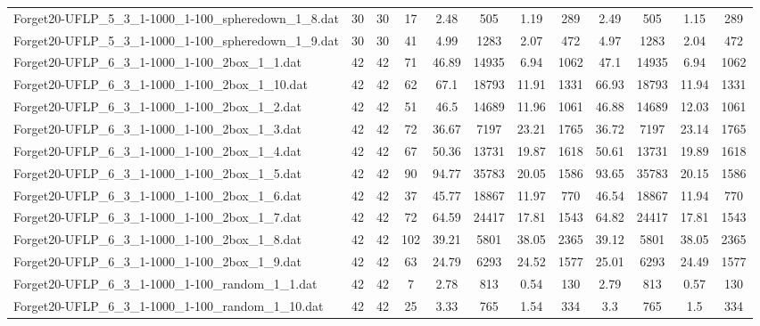 \begin{sidewaystable}[!ht]
{\begin{tabular}{lccccccccccc}
Forget20-UFLP\_5\_3\_1-1000\_1-100\_spheredown\_1\_8.dat & 30 & 30 & 17 & 2.48 & 505 & 1.19 & 289 & 2.49 & 505 &  \textcolor{blue2}{1.15} & 289 \\
Forget20-UFLP\_5\_3\_1-1000\_1-100\_spheredown\_1\_9.dat & 30 & 30 & 41 & 4.99 & 1283 & 2.07 & 472 & 4.97 & 1283 &  \textcolor{blue2}{2.04} & 472 \\
Forget20-UFLP\_6\_3\_1-1000\_1-100\_2box\_1\_1.dat & 42 & 42 & 71 & 46.89 & 14935 &  \textcolor{blue2}{6.94} & 1062 & 47.1 & 14935 &  \textcolor{blue2}{6.94} & 1062 \\
Forget20-UFLP\_6\_3\_1-1000\_1-100\_2box\_1\_10.dat & 42 & 42 & 62 & 67.1 & 18793 &  \textcolor{blue2}{11.91} & 1331 & 66.93 & 18793 & 11.94 & 1331 \\
Forget20-UFLP\_6\_3\_1-1000\_1-100\_2box\_1\_2.dat & 42 & 42 & 51 & 46.5 & 14689 &  \textcolor{blue2}{11.96} & 1061 & 46.88 & 14689 & 12.03 & 1061 \\
Forget20-UFLP\_6\_3\_1-1000\_1-100\_2box\_1\_3.dat & 42 & 42 & 72 & 36.67 & 7197 & 23.21 & 1765 & 36.72 & 7197 &  \textcolor{blue2}{23.14} & 1765 \\
Forget20-UFLP\_6\_3\_1-1000\_1-100\_2box\_1\_4.dat & 42 & 42 & 67 & 50.36 & 13731 & 19.87 & 1618 & 50.61 & 13731 & 19.89 & 1618 \\
Forget20-UFLP\_6\_3\_1-1000\_1-100\_2box\_1\_5.dat & 42 & 42 & 90 & 94.77 & 35783 &  \textcolor{blue2}{20.05} & 1586 & 93.65 & 35783 & 20.15 & 1586 \\
Forget20-UFLP\_6\_3\_1-1000\_1-100\_2box\_1\_6.dat & 42 & 42 & 37 & 45.77 & 18867 & 11.97 & 770 & 46.54 & 18867 &  \textcolor{blue2}{11.94} & 770 \\
Forget20-UFLP\_6\_3\_1-1000\_1-100\_2box\_1\_7.dat & 42 & 42 & 72 & 64.59 & 24417 &  \textcolor{blue2}{17.81} & 1543 & 64.82 & 24417 &  \textcolor{blue2}{17.81} & 1543 \\
Forget20-UFLP\_6\_3\_1-1000\_1-100\_2box\_1\_8.dat & 42 & 42 & 102 & 39.21 & 5801 & 38.05 & 2365 & 39.12 & 5801 & 38.05 & 2365 \\
Forget20-UFLP\_6\_3\_1-1000\_1-100\_2box\_1\_9.dat & 42 & 42 & 63 & 24.79 & 6293 & 24.52 & 1577 & 25.01 & 6293 & 24.49 & 1577 \\
Forget20-UFLP\_6\_3\_1-1000\_1-100\_random\_1\_1.dat & 42 & 42 & 7 & 2.78 & 813 &  \textcolor{blue2}{0.54} & 130 & 2.79 & 813 & 0.57 & 130 \\
Forget20-UFLP\_6\_3\_1-1000\_1-100\_random\_1\_10.dat & 42 & 42 & 25 & 3.33 & 765 & 1.54 & 334 & 3.3 & 765 &  \textcolor{blue2}{1.5} & 334 \\

\end{tabular}}
\end{sidewaystable}
